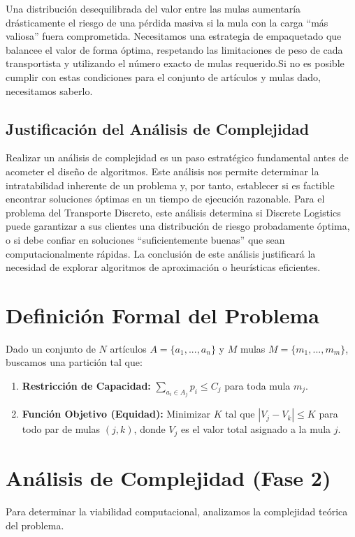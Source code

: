 \documentclass[12pt, a4paper]{article}
\begin{document}
    Una distribución desequilibrada del valor entre las mulas aumentaría drásticamente el riesgo de una pérdida masiva si la mula con la carga ``más valiosa'' fuera comprometida. Necesitamos una estrategia de empaquetado que balancee el valor de forma óptima, respetando las limitaciones de peso de cada transportista y utilizando el número exacto de mulas requerido.Si no es posible cumplir con estas condiciones para el conjunto de artículos y mulas dado, necesitamos saberlo.

    \subsection{Justificación del Análisis de Complejidad}
    Realizar un análisis de complejidad es un paso estratégico fundamental antes de acometer el diseño de algoritmos. Este análisis nos permite determinar la intratabilidad inherente de un problema y, por tanto, establecer si es factible encontrar soluciones óptimas en un tiempo de ejecución razonable. Para el problema del Transporte Discreto, este análisis determina si Discrete Logistics puede garantizar a sus clientes una distribución de riesgo probadamente óptima, o si debe confiar en soluciones ``suficientemente buenas'' que sean computacionalmente rápidas. La conclusión de este análisis justificará la necesidad de explorar algoritmos de aproximación o heurísticas eficientes.

    \section{Definición Formal del Problema}
    Dado un conjunto de $N$ artículos $A = \{a_1, ..., a_n\}$ y $M$ mulas $M = \{m_1, ..., m_m\}$, buscamos una partición tal que:

    \begin{enumerate}
        \item \textbf{Restricción de Capacidad:} $\sum_{a_i \in A_j} p_i \le C_j$ para toda mula $m_j$.
        \item \textbf{Función Objetivo (Equidad):} Minimizar $K$ tal que $|V_j - V_k| \le K$ para todo par de mulas $(j, k)$, donde $V_j$ es el valor total asignado a la mula $j$.
    \end{enumerate}

    \section{Análisis de Complejidad (Fase 2)}
    Para determinar la viabilidad computacional, analizamos la complejidad teórica del problema.
\end{document}

